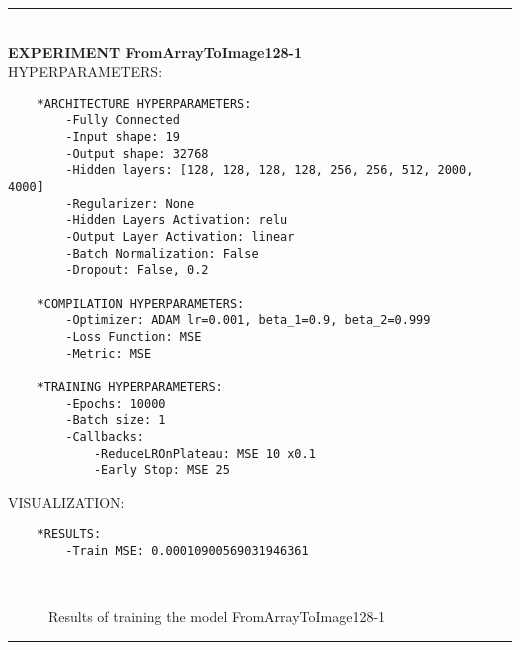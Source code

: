 \rule{0.5\textwidth}{0.5pt}\\

	{\large \textbf{EXPERIMENT FromArrayToImage128-1}}\\
	
	{\normalsize HYPERPARAMETERS:}
	\begin{lstlisting}	
	*ARCHITECTURE HYPERPARAMETERS:
		-Fully Connected
		-Input shape: 19
		-Output shape: 32768
		-Hidden layers: [128, 128, 128, 128, 256, 256, 512, 2000, 4000]
		-Regularizer: None
		-Hidden Layers Activation: relu
		-Output Layer Activation: linear
		-Batch Normalization: False
		-Dropout: False, 0.2
	
	*COMPILATION HYPERPARAMETERS:
		-Optimizer: ADAM lr=0.001, beta_1=0.9, beta_2=0.999
		-Loss Function: MSE
		-Metric: MSE
	
	*TRAINING HYPERPARAMETERS:
		-Epochs: 10000
		-Batch size: 1
		-Callbacks: 
			-ReduceLROnPlateau: MSE 10 x0.1
			-Early Stop: MSE 25
	\end{lstlisting}
	
	{\normalsize VISUALIZATION:}
	\begin{lstlisting}
	*RESULTS:
        -Train MSE: 0.00010900569031946361
	\end{lstlisting}
	
	\begin{figure*}[ht!]
		\hspace{\fill}
		\hspace{\fill}
		\\
		\caption{Results of training the model FromArrayToImage128-1}
	\end{figure*}
	
\FloatBarrier	
\rule{0.5\textwidth}{0.5pt}\\